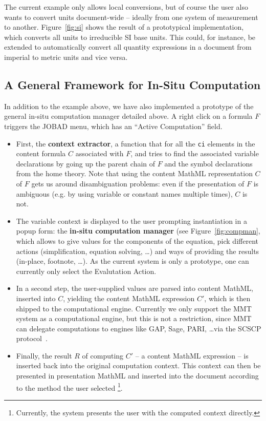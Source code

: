 The current example only allows local conversions, but of course the user also wants to convert units document-wide -- ideally from one system of measurement to another.
Figure~\ref{fig:si} shows the result of a prototypical implementation, which converts all units to irreducible SI base units.
This could, for instance, be extended to automatically convert all quantity expressions in a document from imperial to metric units and vice versa.

\subsection{A General Framework for In-Situ Computation}\label{sec:impl:general}

In addition to the example above, we have also implemented a prototype of the general in-situ computation manager detailed above.
A right click on a formula $F$ triggers the JOBAD menu, which has an ``Active Computation'' field.

  \begin{itemize}
  \item First, the \textbf{context extractor}, a function that for all the \lstinline|ci| elements in the content formula $C$ associated with $F$, and tries to find the associated variable declarations by going up the parent chain of $F$ and the symbol declarations from the home theory.
  Note that using the content MathML representation $C$ of $F$ gets us around disambiguation problems: even if the presentation of $F$ is ambiguous (e.g. by using variable or constant names multiple times), $C$ is not.
  \item The variable context is displayed to the user prompting instantiation in a popup form: the \textbf{in-situ computation manager} (see Figure~\ref{fig:compman}, which allows to give values for the components of the equation, pick different actions (simplification, equation solving, \ldots ) and ways of providing the results (in-place, footnote, \ldots ).
  As the current system is only a prototype, one can currently only select the Evalutation Action.
  \item In a second step, the  user-supplied values are parsed into content MathML, inserted into $C$, yielding the content MathML expression $C'$, which is then shipped to the computational engine.
  Currently we only support the MMT system as a computational engine, but this is not a restriction, since MMT can delegate computations to engines like GAP, Sage, PARI, \ldots via the SCSCP protocol~\cite{ODK-D3.3}.
  \item Finally, the result $R$ of computing $C'$ -- a content MathML expression -- is inserted back into the original computation context.
  This context can then be presented in presentation MathML and inserted into the document according to the method the user selected \footnote{
  Currently, the system presents the user with the computed context directly. }.
  \end{itemize}

